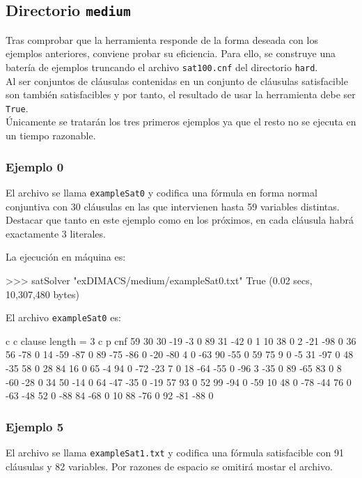 \subsection{Directorio \texttt{medium}}
Tras comprobar que la herramienta responde de la forma deseada con los ejemplos anteriores, conviene probar su eficiencia. Para ello, se construye una batería de ejemplos truncando el archivo \texttt{sat100.cnf} del directorio \texttt{hard}. \\

Al ser conjuntos de cláusulas contenidas en un conjunto de cláusulas satisfacible son también satisfacibles y por tanto, el resultado de usar la herramienta debe ser \texttt{True}.\\

Únicamente se tratarán los tres primeros ejemplos ya que el resto no se ejecuta en un tiempo razonable.

\subsubsection{Ejemplo 0}
El archivo se llama \texttt{exampleSat0} y codifica una fórmula en forma normal conjuntiva con 30 cláusulas en las que intervienen hasta 59 variables distintas. \\ 

Destacar que tanto en este ejemplo como en los próximos, en cada cláusula habrá exactamente 3 literales.

\newpage
La ejecución en máquina es:
\begin{code}
>>> satSolver "exDIMACS/medium/exampleSat0.txt"
True
(0.02 secs, 10,307,480 bytes)
\end{code}

El archivo \texttt{exampleSat0} es:

\begin{codigo}
c 
c    clause length = 3 
c
p cnf 59 30
30 -19 -3 0
89 31 -42 0
1 10 38 0
2 -21 -98 0
36 56 -78 0
14 -59 -87 0
89 -75 -86 0
-20 -80 4 0
-63 90 -55 0
59 75 9 0
-5 31 -97 0
48 -35 58 0
28 84 16 0
65 -4 94 0
-72 -23 7 0
18 -64 -55 0
-96 3 -35 0
89 -65 83 0
8 -60 -28 0
34 50 -14 0
64 -47 -35 0
-19 57 93 0
52 99 -94 0
-59 10 48 0
-78 -44 76 0
-63 -48 52 0
-88 84 -68 0
10 88 -76 0
92 -81 -88 0
\end{codigo}

\newpage
\subsubsection{Ejemplo 5}
El archivo se llama \texttt{exampleSat1.txt} y codifica una fórmula satisfacible con 91 cláusulas y 82 variables. Por razones de espacio se omitirá mostar el archivo. 

